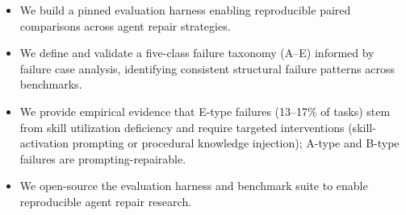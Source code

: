 \begin{itemize}[leftmargin=2em, itemsep=2pt]
  \item We build a pinned evaluation harness enabling reproducible paired comparisons across agent repair strategies.
  \item We define and validate a five-class failure taxonomy (A--E) informed by failure case analysis, identifying consistent structural failure patterns across benchmarks.
  \item We provide empirical evidence that E-type failures (13--17\% of tasks) stem from skill utilization deficiency and require targeted interventions (skill-activation prompting or procedural knowledge injection); A-type and B-type failures are prompting-repairable.
  \item We open-source the evaluation harness and benchmark suite to enable reproducible agent repair research.
\end{itemize}
